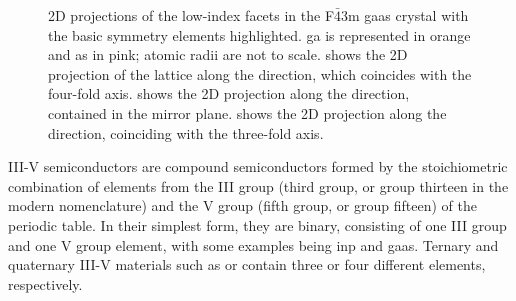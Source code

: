 \begin{figure}
{
    }
    \caption[Low-index facets in the F\(\bar{4}\)3m \acs{gaas} crystal.]{2D projections of the low-index facets in the F\(\bar{4}\)3m \acs{gaas} crystal with the basic symmetry elements highlighted. \Acl{ga} is represented in orange and \acs{as} in pink; atomic radii are not to scale.  shows the 2D projection of the lattice along the  direction, which coincides with the four-fold axis.  shows the 2D projection along the  direction, contained in the mirror plane.  shows the 2D projection along the  direction, coinciding with the three-fold axis.}
    \label{fig:ZB_low_index_facets}
\end{figure}

III-V semiconductors are compound semiconductors formed by the stoichiometric combination of elements from the III group (third group, or group thirteen in the modern nomenclature) and the V group (fifth group, or group fifteen) of the periodic table. In their simplest form, they are binary, consisting of one III group and one V group element, with some examples being \acs{inp} and \acs{gaas}. Ternary and quaternary III-V materials such as  or  contain three or four different elements, respectively. 

